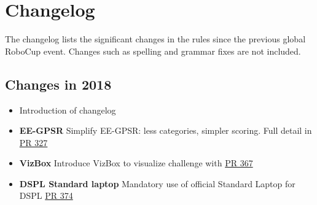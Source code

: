 \section*{Changelog}
The changelog lists the significant changes in the rules since the previous global RoboCup event. 
Changes such as spelling and grammar fixes are not included. 
\subsection*{Changes in 2018}

\begin{itemize}
	\item Introduction of changelog
	\item \textbf{EE-GPSR} Simplify EE-GPSR: less categories, simpler scoring. Full detail in \href{https://github.com/RoboCupAtHome/RuleBook/pull/327}{PR 327}
	\item \textbf{VizBox} Introduce VizBox to visualize challenge with \href{https://github.com/RoboCupAtHome/RuleBook/pull/367}{PR 367}
	\item \textbf{DSPL Standard laptop} Mandatory use of official Standard Laptop for DSPL \href{https://github.com/RoboCupAtHome/RuleBook/pull/374}{PR 374}
\end{itemize}